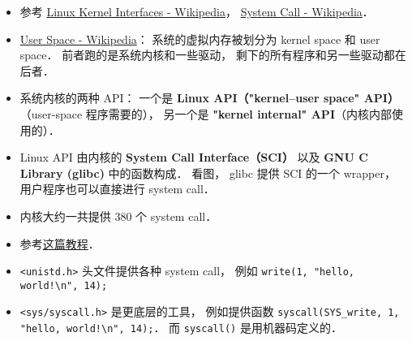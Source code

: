 
\begin{issues}
\issueDraft
\end{issues}

\begin{itemize}
\item 参考 \href{https://en.wikipedia.org/wiki/Linux_kernel_interfaces}{Linux Kernel Interfaces - Wikipedia}， \href{https://en.wikipedia.org/wiki/System_call}{System Call - Wikipedia}．
\item \href{https://en.wikipedia.org/wiki/User_space_and_kernel_space}{User Space - Wikipedia}： 系统的虚拟内存被划分为 kernel space 和 user space． 前者跑的是系统内核和一些驱动， 剩下的所有程序和另一些驱动都在后者．
\item 系统内核的两种 API： 一个是 \textbf{Linux API（"kernel–user space" API）}（user-space 程序需要的）， 另一个是 \textbf{"kernel internal" API}（内核内部使用的）．
\item Linux API 由内核的 \textbf{System Call Interface（SCI）} 以及 \textbf{GNU C Library (glibc)} 中的函数构成． 看图， glibc 提供 SCI 的一个 wrapper， 用户程序也可以直接进行 system call．
\item 内核大约一共提供 380 个 system call．
\item 参考\href{https://jameshfisher.com/2018/02/19/how-to-syscall-in-c/}{这篇教程}．
\item \verb|<unistd.h>| 头文件提供各种 system call， 例如 \verb|write(1, "hello, world!\n", 14);|
\item \verb|<sys/syscall.h>| 是更底层的工具， 例如提供函数 \verb|syscall(SYS_write, 1, "hello, world!\n", 14);|． 而 \verb|syscall()| 是用机器码定义的．
\end{itemize}
